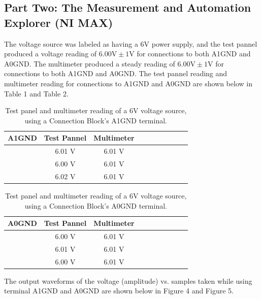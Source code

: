\documentclass[twoside,10pt]{article}
\begin{document}
\begin{multicols}{2}
				
		\subsection*{Part  Two: The Measurement and Automation Explorer (NI MAX)}
		
			The voltage source was labeled as having a  6V power supply, and the test pannel produced a voltage reading of $6.00 \text{V} \pm 1\text{V}$ for connections to both A1GND and A0GND. The multimeter produced a steady reading of $6.00 \text{V} \pm 1 \text{V}$ for connections to both A1GND and A0GND. The test pannel reading and multimeter reading for connections to A1GND and A0GND are shown below in Table 1 and Table 2. 
		
			\begin{table}[H]
			\centering
			\caption{Test panel and multimeter reading of a 6V voltage source, using a Connection Block's A1GND terminal. }
			\begin{tabular}{l c c rrrrrrr}
				\toprule				
				A1GND & Test Pannel & Multimeter  \\ [1ex]
				\midrule
				&	6.01 V & 6.01 V  \\ [1.5ex]
				&	6.00 V & 6.01 V  \\ [1.5ex]
				&	6.02 V & 6.01 V \\ [1.5ex]
				\bottomrule
			\end{tabular}
		\end{table}
	
		\begin{table}[H]
		\centering
		\caption{Test panel and multimeter reading of a 6V voltage source, using a Connection Block's A0GND terminal.}
		\begin{tabular}{l c c rrrrrrr}
			\toprule				
			A0GND & Test Pannel & Multimeter  \\ [1ex]
			\midrule
			&	6.00 V & 6.01 V  \\ [1.5ex]
			&	6.01 V & 6.01 V  \\ [1.5ex]
			&	6.00 V & 6.01 V \\ [1.5ex]
			\bottomrule
		\end{tabular}
	\end{table}
		
		The output waveforms of the voltage (amplitude) vs. samples taken while using terminal A1GND and A0GND are shown below in Figure 4 and Figure 5.
		

\end{multicols}
\end{document}
